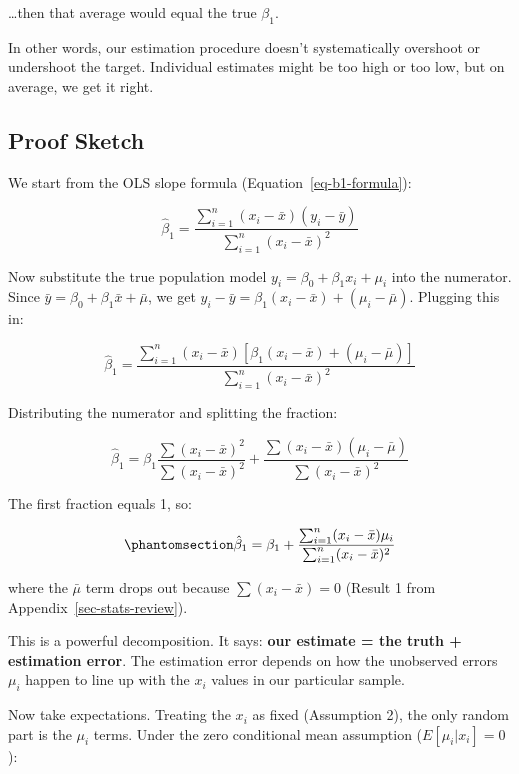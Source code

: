 \documentclass[
  letterpaper,
  DIV=11,
  numbers=noendperiod]{scrreprt}
\begin{document}
\ldots then that average would equal the true \(\beta_1\).

In other words, our estimation procedure doesn't systematically
overshoot or undershoot the target. Individual estimates might be too
high or too low, but on average, we get it right.

\subsection{Proof Sketch}\label{proof-sketch}

We start from the OLS slope formula (Equation~\ref{eq-b1-formula}):

\[
\hat{\beta}_1 = \frac{\sum_{i=1}^{n}(x_i - \bar{x})(y_i - \bar{y})}{\sum_{i=1}^{n}(x_i - \bar{x})^2}
\]

Now substitute the true population model
\(y_i = \beta_0 + \beta_1 x_i + \mu_i\) into the numerator. Since
\(\bar{y} = \beta_0 + \beta_1 \bar{x} + \bar{\mu}\), we get
\(y_i - \bar{y} = \beta_1(x_i - \bar{x}) + (\mu_i - \bar{\mu})\).
Plugging this in:

\[
\hat{\beta}_1 = \frac{\sum_{i=1}^{n}(x_i - \bar{x})[\beta_1(x_i - \bar{x}) + (\mu_i - \bar{\mu})]}{\sum_{i=1}^{n}(x_i - \bar{x})^2}
\]

Distributing the numerator and splitting the fraction:

\[
\hat{\beta}_1 = \beta_1 \frac{\sum(x_i - \bar{x})^2}{\sum(x_i - \bar{x})^2} + \frac{\sum(x_i - \bar{x})(\mu_i - \bar{\mu})}{\sum(x_i - \bar{x})^2}
\]

The first fraction equals 1, so:

\begin{equation}\protect\phantomsection\label{eq-decomposition}{
\hat{\beta}_1 = \beta_1 + \frac{\sum_{i=1}^{n}(x_i - \bar{x})\mu_i}{\sum_{i=1}^{n}(x_i - \bar{x})^2}
}\end{equation}

where the \(\bar{\mu}\) term drops out because
\(\sum(x_i - \bar{x}) = 0\) (Result 1 from
Appendix~\ref{sec-stats-review}).

This is a powerful decomposition. It says: \textbf{our estimate = the
truth + estimation error}. The estimation error depends on how the
unobserved errors \(\mu_i\) happen to line up with the \(x_i\) values in
our particular sample.

Now take expectations. Treating the \(x_i\) as fixed (Assumption 2), the
only random part is the \(\mu_i\) terms. Under the zero conditional mean
assumption (\(E[\mu_i | x_i] = 0\)):
\end{document}
